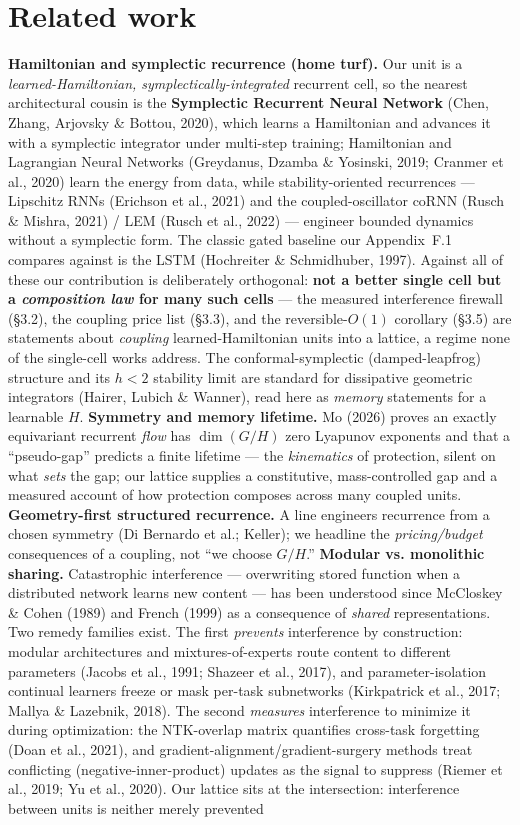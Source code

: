 \documentclass[11pt]{article}
\begin{document}
\section{Related work}
\textbf{Hamiltonian and symplectic recurrence (home turf).} Our unit is a \emph{learned-Hamiltonian, symplectically-integrated} recurrent cell, so the nearest architectural cousin is the \textbf{Symplectic Recurrent Neural Network} (Chen, Zhang, Arjovsky \& Bottou, 2020), which learns a Hamiltonian and advances it with a symplectic integrator under multi-step training; Hamiltonian and Lagrangian Neural Networks (Greydanus, Dzamba \& Yosinski, 2019; Cranmer et al., 2020) learn the energy from data, while stability-oriented recurrences --- Lipschitz RNNs (Erichson et al., 2021) and the coupled-oscillator coRNN (Rusch \& Mishra, 2021) / LEM (Rusch et al., 2022) --- engineer bounded dynamics without a symplectic form. The classic gated baseline our Appendix~F.1 compares against is the LSTM (Hochreiter \& Schmidhuber, 1997). Against all of these our contribution is deliberately orthogonal: \textbf{not a better single cell but a \emph{composition law} for many such cells} --- the measured interference firewall (\S3.2), the coupling price list (\S3.3), and the reversible-$O(1)$ corollary (\S3.5) are statements about \emph{coupling} learned-Hamiltonian units into a lattice, a regime none of the single-cell works address. The conformal-symplectic (damped-leapfrog) structure and its $h<2$ stability limit are standard for dissipative geometric integrators (Hairer, Lubich \& Wanner), read here as \emph{memory} statements for a learnable $H$. \textbf{Symmetry and memory lifetime.} Mo (2026) proves an exactly equivariant recurrent \emph{flow} has $\dim(G/H)$ zero Lyapunov exponents and that a ``pseudo-gap'' predicts a finite lifetime --- the \emph{kinematics} of protection, silent on what \emph{sets} the gap; our lattice supplies a constitutive, mass-controlled gap and a measured account of how protection composes across many coupled units. \textbf{Geometry-first structured recurrence.} A line engineers recurrence from a chosen symmetry (Di Bernardo et al.; Keller); we headline the \emph{pricing/budget} consequences of a coupling, not ``we choose $G/H$.'' \textbf{Modular vs. monolithic sharing.} Catastrophic interference --- overwriting stored function when a distributed network learns new content --- has been understood since McCloskey \& Cohen (1989) and French (1999) as a consequence of \emph{shared} representations. Two remedy families exist. The first \emph{prevents} interference by construction: modular architectures and mixtures-of-experts route content to different parameters (Jacobs et al., 1991; Shazeer et al., 2017), and parameter-isolation continual learners freeze or mask per-task subnetworks (Kirkpatrick et al., 2017; Mallya \& Lazebnik, 2018). The second \emph{measures} interference to minimize it during optimization: the NTK-overlap matrix quantifies cross-task forgetting (Doan et al., 2021), and gradient-alignment/gradient-surgery methods treat conflicting (negative-inner-product) updates as the signal to suppress (Riemer et al., 2019; Yu et al., 2020). Our lattice sits at the intersection: interference between units is neither merely prevented 
\end{document}
